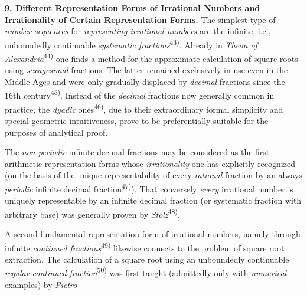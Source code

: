 \thispagestyle{fancy}

\vspace{0.5cm}

\textbf{9. Different Representation Forms of Irrational Numbers and Irrationality of Certain Representation Forms.} The simplest type of \textit{number sequences} for \textit{representing irrational numbers} are the infinite, i.e., unboundedly continuable \textit{systematic fractions}\textsuperscript{43)}. Already in \textit{Theon of Alexandria}\textsuperscript{44)} one finds a method for the approximate calculation of square roots using \textit{sexagesimal} fractions. The latter remained exclusively in use even in the Middle Ages and were only gradually displaced by \textit{decimal} fractions since the 16th century\textsuperscript{45)}. Instead of the \textit{decimal} fractions now generally common in practice, the \textit{dyadic} ones\textsuperscript{46)}, due to their extraordinary formal simplicity and special geometric intuitiveness, prove to be preferentially suitable for the purposes of analytical proof.

The \textit{non-periodic} infinite decimal fractions may be considered as the first arithmetic representation forms whose \textit{irrationality} one has explicitly recognized (on the basis of the unique representability of every \textit{rational} fraction by an always \textit{periodic} infinite decimal fraction\textsuperscript{47)}). That conversely \textit{every} irrational number is uniquely representable by an infinite decimal fraction (or systematic fraction with arbitrary base) was generally proven by \textit{Stolz}\textsuperscript{48)}.

A second fundamental representation form of irrational numbers, namely through infinite \textit{continued fractions}\textsuperscript{49)} likewise connects to the problem of square root extraction. The calculation of a square root using an unboundedly continuable \textit{regular continued fraction}\textsuperscript{50)} was first taught (admittedly only with \textit{numerical} examples) by \textit{Pietro}

